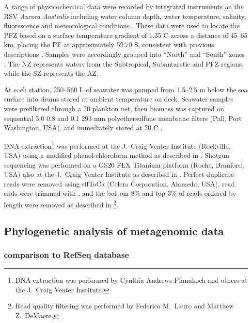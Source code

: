 

A range of physicochemical data were recorded by integrated instruments on the RSV \emph{Aurora Australis} including water column depth, water temperature, salinity, fluorescence and meteorological conditions .
These data were used to locate the \ac{PFZ} based on a surface temperature gradient of \textapprox{}1.35 \textdegree{}C across a distance of 45--65 km, placing the \ac{PF} at approximately 59.70\textdegree{} S, consistent with previous descriptions \cite{Moore:1999to,Sokolov:2002tc}.
Samples were accordingly grouped into ``North'' and ``South'' zones .
The \ac{NZ} represents waters from the Subtropical, Subantarctic and \ac{PFZ} regions, while the \ac{SZ} represents the \ac{AZ}.



At each station, \textapprox{}250--560 L of seawater was pumped from \textapprox{}1.5--2.5 m below the sea surface into drums stored at ambient temperature on deck. 
Seawater samples were prefiltered through a 20 \micron{} plankton net, then biomass was captured on sequential 3.0 \micron{} 0.8 \micron{} and 0.1 \micron{} 293 mm polyethersulfone membrane filters (Pall, Port Washington, USA), and immediately stored at \textminus{}20 \textdegree{}C \cite{Rusch:2007ez,Ng:2010cd}.

DNA extraction\footnote{DNA extraction was performed by Cynthia Andrews-Pfannkoch and others at the J.\ Craig Venter Institute.} was performed at the J.\ Craig Venter Institute (Rockville, USA) using a modified phenol-chloroform method as described in \citet{Rusch:2007ez}.
Shotgun sequencing was performed on a GS20 FLX Titanium platform (Roche, Branford, USA) also at the J.\ Craig Venter Institute as described in \citet{Lauro:2010jna}.
Perfect duplicate reads were removed using sffToCa (Celera Corporation, Alameda, USA),  read ends were trimmed with  \cite{Chou:2001ck}, and the bottom 8\% and top 3\% of reads ordered by length were removed as described in \citet{Lauro:2010jna}\footnote{Read quality filtering was performed by Federico M.\ Lauro and Matthew Z.\ DeMaere.}.

\subsection{Phylogenetic analysis of metagenomic data}

\subsubsection{ comparison to RefSeq database}

